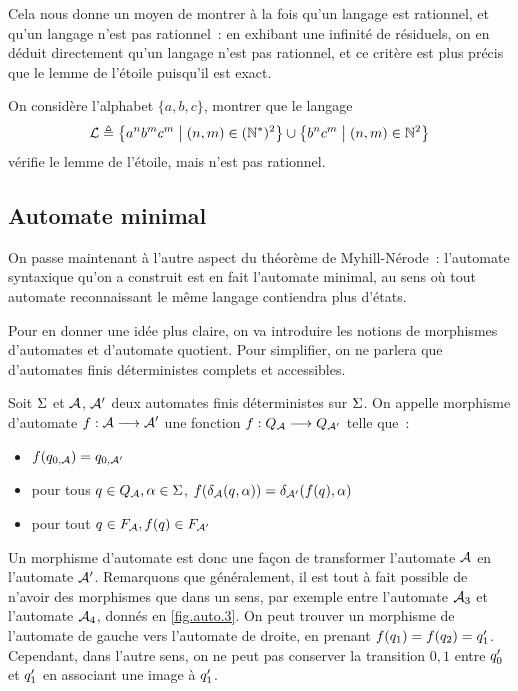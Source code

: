Cela nous donne un moyen de montrer à la fois qu'un langage est rationnel, et
qu'un langage n'est pas rationnel~: en exhibant une infinité de résiduels, on en
déduit directement qu'un langage n'est pas rationnel, et ce critère est plus
précis que le lemme de l'étoile puisqu'il est exact.

\begin{exercise}
  On considère l'alphabet $\{a,b,c\}$, montrer que le langage
  \[\mathcal L \triangleq \left\{ a^nb^mc^m \;\middle\vert\; (n,m)\in (\mathbb N^*)^2 \right\}\cup
  \left\{ b^nc^m \;\middle\vert\; (n,m)\in \mathbb N^2 \right\}\]
  vérifie le lemme de l'étoile, mais n'est pas rationnel.
\end{exercise}

\subsection{Automate minimal}

On passe maintenant à l'autre aspect du théorème de Myhill-Nérode~: l'automate
syntaxique qu'on a construit est en fait l'automate minimal, au sens où tout
automate reconnaissant le même langage contiendra plus d'états.

Pour en donner une idée plus claire, on va introduire les notions de morphismes
d'automates et d'automate quotient. Pour simplifier, on ne parlera que
d'automates finis déterministes complets et accessibles.

\begin{definition}
  Soit $\Sigma$ et $\mathcal{A}$, $\mathcal{A}'$ deux automates finis déterministes sur
  $\Sigma$. On appelle morphisme d'automate $f : \displaystyle \mathcal{A} \longrightarrow \mathcal{A}'$
  une fonction $f : \displaystyle Q_{\mathcal{A}} \longrightarrow Q_{\mathcal{A}'}$ telle que~:
  \begin{itemize}
  \item $f(q_{0,\mathcal{A}}) = q_{0,\mathcal{A}'}$
  \item pour tous $q_{} \in Q_{\mathcal{A}}, \alpha \in \Sigma$,
    $f(\delta_{\mathcal{A}}(q_{},\alpha)) = \delta_{\mathcal{A}'}(f(q_{}),\alpha)$
  \item pour tout $q_{} \in F_{\mathcal{A}}, f(q) \in F_{\mathcal{A}'}$
  \end{itemize}
\end{definition}

Un morphisme d'automate est donc une façon de transformer l'automate $\mathcal{A}$
en l'automate $\mathcal{A}'$. Remarquons que généralement, il est tout à fait
possible de n'avoir des morphismes que dans un sens, par exemple entre
l'automate $\mathcal{A}_3$ et l'automate $\mathcal{A}_4$, donnés en \cref{fig.auto.3}.
On peut trouver un morphisme de l'automate de gauche vers l'automate de droite,
en prenant $f(q_{1}) = f(q_{2}) = q_{1}'$. Cependant, dans l'autre
sens, on ne peut pas conserver la transition $0,1$ entre $q_{0}'$ et
$q_{1}'$ en associant une image à $q_{1}'$.

